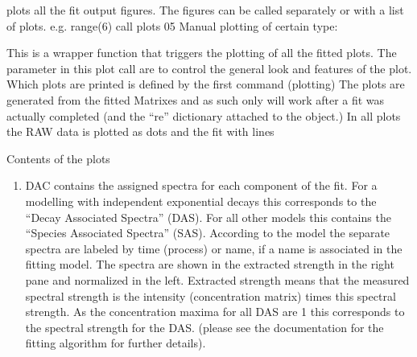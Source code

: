 \documentclass[letterpaper,10pt,english]{sphinxmanual}
\begin{document}
\begin{fulllineitems}
\begin{fulllineitems}
\label{\detokenize{plot_func:plot_func.TA.Plot_fit_output}}
plots all the fit output figures. The figures can be called separately
or with a list of plots. e.g. range(6) call plots 0\sphinxhyphen{}5 Manual plotting of certain type:

This is a wrapper function that triggers the plotting of all the fitted plots.
The parameter in this plot call are to control the general look and features of the plot.
Which plots are printed is defined by the first command (plotting)
The plots are generated from the fitted Matrixes and as such only will work after a fit was actually
completed (and the “re” dictionary attached to the object.)
In all plots the RAW data is plotted as dots and the fit with lines

Contents of the plots
\begin{enumerate}
%
\setcounter{enumi}{-1}
\item {} 
DAC contains the assigned spectra for each component of the fit. For
a modelling with independent exponential decays this corresponds to
the “Decay Associated Spectra” (DAS). For all other models this
contains the “Species Associated Spectra” (SAS). According to the
model the separate spectra are labeled by time (process) or name, if
a name is associated in the fitting model. The spectra are shown in
the extracted strength in the right pane and normalized in the left.
Extracted strength means that the measured spectral strength is the
intensity (concentration matrix) times this spectral strength. As the
concentration maxima for all DAS are 1 this corresponds to the
spectral strength for the DAS. (please see the documentation for the
fitting algorithm for further details).


\end{enumerate}
\end{fulllineitems}
\end{fulllineitems}
\end{document}
